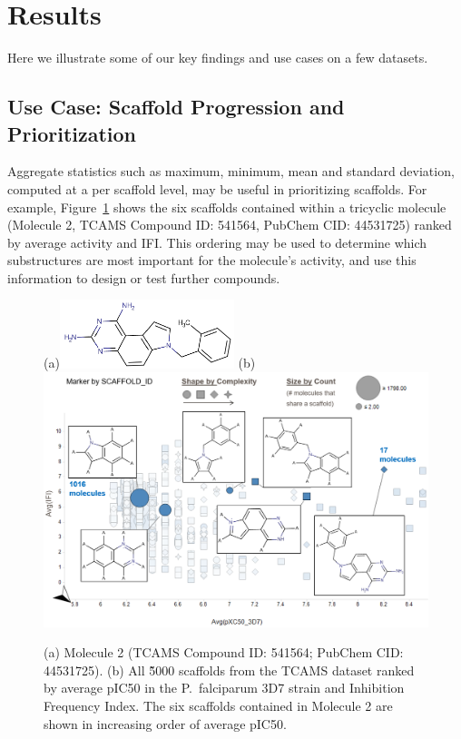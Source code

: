 \documentclass[journal=jacsat,biochem,manuscript=article]{achemso}
\newcommand*\fref[1]{Figure~\ref{fig:#1}}
\newcommand*\ie{i.e.,~}
\begin{document}


\section{Results}
\label{sec:results}
Here we illustrate some of our key findings and use cases on a few datasets. 

\subsection{Use Case: Scaffold Progression and Prioritization}
Aggregate statistics such as maximum, minimum, mean and standard
deviation, computed at a per scaffold level, may be useful in
prioritizing scaffolds. For example, \fref{RGTaggr} shows the six
scaffolds contained within a tricyclic molecule (Molecule
2, TCAMS Compound ID: 541564, PubChem CID: 44531725)
ranked by average activity and IFI. This ordering may
be used to determine which substructures are most important for the
molecule's activity, and use this information to design or test
further compounds.

\begin{figure}
  (a)\includegraphics[width=2in]{fig/tcam2_mol_541564_v2.png}
  (b)\includegraphics[width=5in]{fig/RGT_aggr_prop3.png}
  \caption{(a) Molecule 2 (TCAMS Compound ID: 541564; PubChem CID: 44531725).
    (b) All \~5000 scaffolds from the TCAMS dataset ranked by
    average pIC50 in the P.~falciparum 3D7 strain and Inhibition
    Frequency Index. The six scaffolds contained in Molecule 2
    are shown in increasing order of average pIC50.}
\label{fig:RGTaggr}   
\end{figure}
\end{document}
